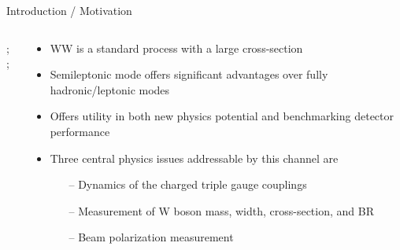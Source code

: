 \documentclass[10pt]{beamer}
\begin{document}
\begin{frame}{Introduction / Motivation}

\begin{columns}
\begin{column}{0.5\textwidth}
;
    ;
\end{column}
\begin{column}{0.5\textwidth}
\begin{itemize}
	\item WW is a standard process with a large cross-section 
		
		
		\item Semileptonic mode offers significant advantages over fully hadronic/leptonic modes
\item Offers utility in both new physics potential and benchmarking detector performance
	\item Three central physics issues addressable by this channel are
		\begin{itemize}
		\scriptsize
		\item[--] Dynamics of the charged triple gauge couplings
		\item[--] Measurement of W boson mass, width, cross-section, and BR
		\item[--] Beam polarization measurement
		\end{itemize}
		\end{itemize}
\end{column}
\end{columns}

\end{frame}
\end{document}

